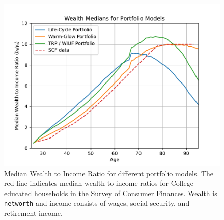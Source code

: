 \documentclass{article}
\begin{document}
\begin{figure}[!htbp]
\centering
\includegraphics[width=0.7\linewidth]{files/median_wealth-d2524c71e6344dd7c4922a55ce47bf79.pdf}
\caption[]{Median Wealth to Income Ratio for different portfolio models. The red line indicates median wealth-to-income ratios for College educated households in the Survey of Consumer Finances. Wealth is \texttt{networth} and income consists of wages, social security, and retirement income.}
\label{medwealth}
\end{figure}
\end{document}
